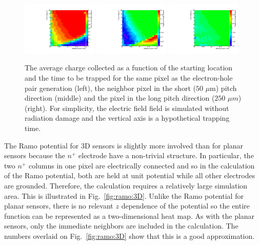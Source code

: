 \begin{figure}[!htpb]
\centering
\includegraphics[width=0.32\textwidth]{testramo_corrected_other.pdf}
\includegraphics[width=0.32\textwidth]{testramo_induced_0_1.pdf}
\includegraphics[width=0.32\textwidth]{testramo_induced_1_0.pdf}
\caption{The average charge collected as a function of the starting location and the time to be trapped for the same pixel as the electron-hole pair generation (left), the neighbor pixel in the short ($50$ $\mu $m) pitch direction (middle) and the pixel in the long pitch direction ($250$ $\mu m$) (right).  For simplicity, the electric field field is simulated without radiation damage and the vertical axis is a hypothetical trapping time.}
\label{fig:ramo:check}
\end{figure}

The Ramo potential for 3D sensors is slightly more involved than for planar sensors because the $n^+$ electrode have a non-trivial structure.  In particular, the two $n^+$ columns in one pixel are electrically connected and so in the calculation of the Ramo potential, both are held at unit potential while all other electrodes are grounded.  Therefore, the calculation requires a relatively large simulation area.  This is illustrated in Fig.~\ref{fig:ramo:3D}.  Unlike the Ramo potential for planar sensors, there is no relevant $z$ dependence of the potential so the entire function can be represented as a two-dimensional heat map.  As with the planar sensors, only the immediate neighbors are included in the calculation.  The numbers overlaid on Fig.~\ref{fig:ramo:3D} show that this is a good approximation. 

